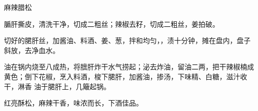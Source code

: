 \begin{recipe}{麻辣腊松}

\ingredients


\preparation

\step 腯肝撕皮，清洗干净，切成二粗丝；辣椒去籽，切成二粗丝，姜拍破。

\step 切好的𬂁肝丝，加酱油、料酒、姜、葱，拌和均匀，，渍十分钟，摊在盘内，盘子
斜放，去净血水。

\step 油在锅内烧至八成热，将膪肝炸干水气捞起；泌去炸油，留油二两，把干辣椒楠成
黄色；倒下花椒，烹入料酒，梭下𬂁肝，加酱油，掺汤，下味精、白糖，滋汁收干，淋香
油于𬂁肝上，几簸起锅。

\features

红亮酥松，麻辣干香，味浓而长，下酒佳品。

\end{recipe}

